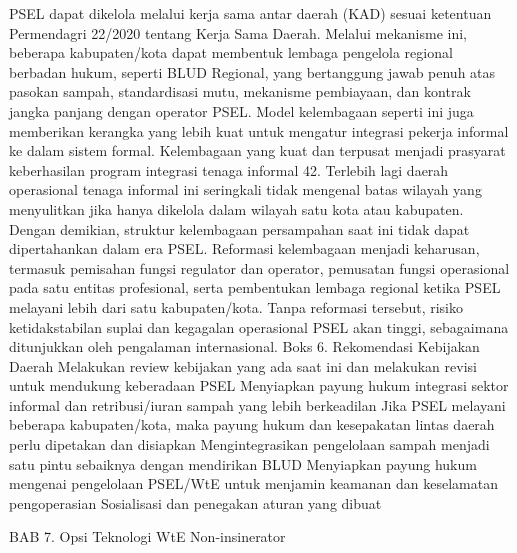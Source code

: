 \documentclass[
  letterpaper,
  DIV=11,
  numbers=noendperiod]{scrreprt}
\begin{document}
PSEL dapat dikelola melalui kerja sama antar daerah (KAD) sesuai
ketentuan Permendagri 22/2020 tentang Kerja Sama Daerah. Melalui
mekanisme ini, beberapa kabupaten/kota dapat membentuk lembaga pengelola
regional berbadan hukum, seperti BLUD Regional, yang bertanggung jawab
penuh atas pasokan sampah, standardisasi mutu, mekanisme pembiayaan, dan
kontrak jangka panjang dengan operator PSEL. Model kelembagaan seperti
ini juga memberikan kerangka yang lebih kuat untuk mengatur integrasi
pekerja informal ke dalam sistem formal. Kelembagaan yang kuat dan
terpusat menjadi prasyarat keberhasilan program integrasi tenaga
informal 42. Terlebih lagi daerah operasional tenaga informal ini
seringkali tidak mengenal batas wilayah yang menyulitkan jika hanya
dikelola dalam wilayah satu kota atau kabupaten. Dengan demikian,
struktur kelembagaan persampahan saat ini tidak dapat dipertahankan
dalam era PSEL. Reformasi kelembagaan menjadi keharusan, termasuk
pemisahan fungsi regulator dan operator, pemusatan fungsi operasional
pada satu entitas profesional, serta pembentukan lembaga regional ketika
PSEL melayani lebih dari satu kabupaten/kota. Tanpa reformasi tersebut,
risiko ketidakstabilan suplai dan kegagalan operasional PSEL akan
tinggi, sebagaimana ditunjukkan oleh pengalaman internasional. Boks 6.
Rekomendasi Kebijakan Daerah Melakukan review kebijakan yang ada saat
ini dan melakukan revisi untuk mendukung keberadaan PSEL Menyiapkan
payung hukum integrasi sektor informal dan retribusi/iuran sampah yang
lebih berkeadilan Jika PSEL melayani beberapa kabupaten/kota, maka
payung hukum dan kesepakatan lintas daerah perlu dipetakan dan disiapkan
Mengintegrasikan pengelolaan sampah menjadi satu pintu sebaiknya dengan
mendirikan BLUD Menyiapkan payung hukum mengenai pengelolaan PSEL/WtE
untuk menjamin keamanan dan keselamatan pengoperasian Sosialisasi dan
penegakan aturan yang dibuat

BAB 7. Opsi Teknologi WtE Non-insinerator
\end{document}
